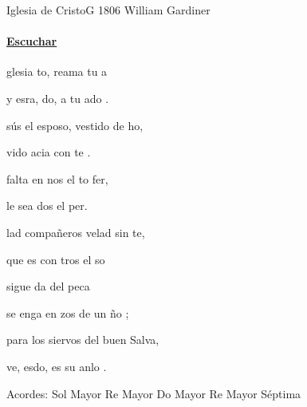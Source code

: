 \documentclass[12pt, spanish]{book}
\begin{document}
    \begin{song}{Iglesia de Cristo}{G}
    {1806} %
    {William Gardiner}
    {} %
    {}
        \ifChordBk
        \paragraph{\mbox{}\hfill\protect\href{https://open.spotify.com/intl-es/track/1syiUnSkF3ZiwJD5XnuTsJ}{Escuchar}\mbox{}\hfill}
        \fi

        \begin{SBOpGroup}
            glesia  to, reama tu a

            y esra, do, a tu ado .

            sús el esposo, vestido de ho,

            vido  acia con te .
        \end{SBOpGroup}
        \vskip 20pt
        \begin{SBOpGroup}
             falta en nos el to fer,

            le  sea  dos el per.

            lad compañeros velad sin te,

            que es con tros el so
        \end{SBOpGroup}
        \vskip 20pt
        \begin{SBOpGroup}
             sigue  da del  peca

            se enga en  zos de un ño ;

             para los siervos del buen Salva,

            ve, esdo, es su anlo .
        \end{SBOpGroup}

        \ifChordBk
        \begin{SBOpGroup}
            Acordes:
            \upchord{\G}\qquad Sol Mayor \hfill
            \upchord{\D}\qquad Re Mayor \hfill\null\break
            \upchord{\C}\qquad Do Mayor \hfill
            \upchord{\Dseven}\qquad Re Mayor S\'eptima \hfill\null\break
        \end{SBOpGroup}
        \fi
    \end{song}
\end{document}
